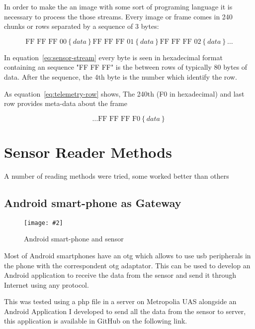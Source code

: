 \documentclass[hidelinks,11pt,a4paper,oneside,article]{memoir}
\newcommand{\putimage}[3][10] %
{
\begin{figure}[h]
	\centering
	\captionsetup{justification=centering}
	\texttt{[image: \#2]}
	\caption{#3}
	\label{fig:#2}
\end{figure}
}
\begin{document}
 In order to make the an image with some sort of programing language it is necessary to process the those streams. Every image or frame comes in 240 chunks or rows separated by a sequence of 3 bytes:

\begin{equation}
\label{eq:sensor-stream}
\text {FF FF FF 00} \left\lbrace data \right\rbrace 
\text {FF FF FF 01} \left\lbrace data \right\rbrace 
\text {FF FF FF 02} \left\lbrace data \right\rbrace \dots
\end{equation}



In equation~\ref{eq:sensor-stream} every byte is seen in hexadecimal format containing an sequence "FF FF FF" is the between rows of typically 80 bytes of data. After the sequence, the 4th byte is the number which identify the row.

As equation~\ref{eq:telemetry-row} shows, The 240th (F0 in hexadecimal) and last row provides meta-data about the frame

\begin{equation}
\label{eq:telemetry-row}
\dots \text {FF FF FF F0} \left\lbrace data \right\rbrace
\end{equation}




\section{Sensor Reader Methods}
A number of reading methods were tried, some worked better than others

\subsection{Android smart-phone as Gateway}

\putimage{android_otg}{Android smart-phone and sensor}

Most of Android smartphones have an \gls{otg} which allows to use usb peripherals in the phone with the correspondent \gls{otg} adaptator. This can be used to develop an Android application to receive the data from the sensor and send it through Internet using any protocol.


This was tested using a \gls{php} file in a server on Metropolia UAS alongside an Android Application I developed to send all the data from the sensor to server, this application is available in GitHub on the following link. %
 
\end{document}
